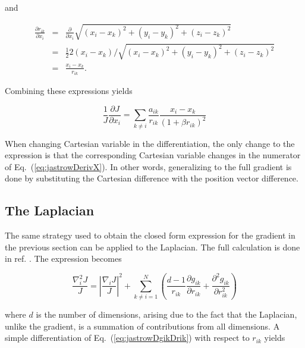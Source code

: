 and

\begin{eqnarray}
 \frac{\partial r_{ik}}{\partial x_i} &=& \frac{\partial }{\partial x_i} \sqrt{(x_i - x_k)^2 + (y_i - y_k)^2 + (z_i - z_k)^2} \nonumber \\
  &=& \frac{1}{2} 2(x_i - x_k) / \sqrt{(x_i - x_k)^2 + (y_i - y_k)^2 + (z_i - z_k)^2} \nonumber \\
  &=& \frac{x_i - x_k}{r_{ik}}.
\end{eqnarray}

Combining these expressions yields

\begin{equation}
\label{eq:jastrowDerivX}
 \frac{1}{J}\frac{\partial J}{\partial x_i} = \sum_{k \ne i} \frac{a_{ik}}{r_{ik}}\frac{x_i - x_k}{(1 + \beta r_{ik})^2}
\end{equation}

When changing Cartesian variable in the differentiation, the only change to the expression is that the corresponding Cartesian variable changes in the numerator of Eq.~(\ref{eq:jastrowDerivX}). In other words, generalizing to the full gradient is done by substituting the Cartesian difference with the position vector difference.



\subsection{The Laplacian}

The same strategy used to obtain the closed form expression for the gradient in the previous section can be applied to the Laplacian. The full calculation is done in ref. \cite{morten}. The expression becomes

\begin{equation}
\label{eq:jastrowLaplRaw}
 \frac{\nabla^2_i J}{J} = \left| \frac{\nabla_i J}{J}\right|^2 + \sum_{k \ne i = 1}^N \left(\frac{d-1}{r_{ik}}\frac{\partial g_{ik}}{\partial r_{ik}} + \frac{\partial^2 g_{ik}}{\partial r_{ik}^2}\right) 
\end{equation}

where $d$ is the number of dimensions, arising due to the fact that the Laplacian, unlike the gradient, is a summation of contributions from all dimensions. A simple differentiation of Eq.~(\ref{eq:jastrowDgikDrik}) with respect to $r_{ik}$ yields

